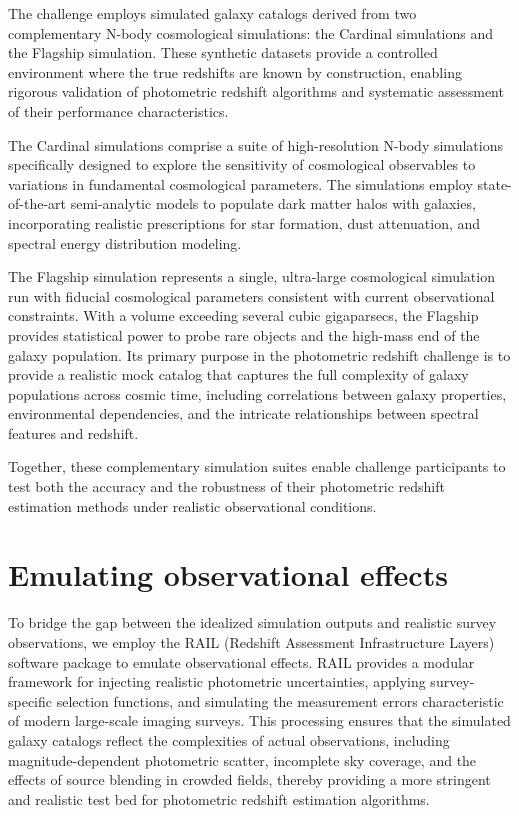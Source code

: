 \documentclass[modern]{desc-tex/styles/lsstdescnote}
\begin{document}
The challenge employs simulated galaxy catalogs derived from two
complementary N-body cosmological simulations: the Cardinal
simulations and the Flagship simulation. These synthetic datasets
provide a controlled environment where the true redshifts are known by
construction, enabling rigorous validation of photometric redshift
algorithms and systematic assessment of their performance
characteristics.

The Cardinal simulations comprise a suite of high-resolution N-body
simulations specifically designed to explore the sensitivity of
cosmological observables to variations in fundamental cosmological
parameters.   The simulations employ state-of-the-art semi-analytic
models to populate dark matter halos with galaxies, incorporating
realistic prescriptions for star formation, dust attenuation, and
spectral energy distribution modeling.

The Flagship simulation represents a single, ultra-large cosmological
simulation run with fiducial cosmological parameters consistent with
current observational constraints. With a volume exceeding several
cubic gigaparsecs, the Flagship provides statistical power to probe
rare objects and the high-mass end of the galaxy population. Its
primary purpose in the photometric redshift challenge is to provide a
realistic mock catalog that captures the full complexity of galaxy
populations across cosmic time, including correlations between galaxy
properties, environmental dependencies, and the intricate
relationships between spectral features and redshift.

Together, these complementary simulation suites enable challenge
participants to test both the accuracy and the robustness of their
photometric redshift estimation methods under realistic observational
conditions.

\section{Emulating observational effects}

To bridge the gap between the idealized simulation outputs and
realistic survey observations, we employ the RAIL (Redshift Assessment
Infrastructure Layers) software package to emulate observational
effects. RAIL provides a modular framework for injecting realistic
photometric uncertainties, applying survey-specific selection
functions, and simulating the measurement errors characteristic of
modern large-scale imaging surveys. This processing ensures that the
simulated galaxy catalogs reflect the complexities of actual
observations, including magnitude-dependent photometric scatter,
incomplete sky coverage, and the effects of source blending in crowded
fields, thereby providing a more stringent and realistic test bed for
photometric redshift estimation algorithms.
\end{document}
